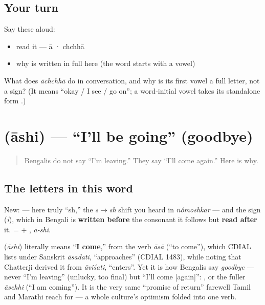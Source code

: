 \subsection*{Your turn}
Say these aloud:

\begin{itemize}
\raggedright
  \item read it — ā · chchhā
  \item why  is written in full here (the word starts with a vowel)
\end{itemize}

\begin{tcolorbox}[breakable,colback=teal!4,colframe=teal!35!black,title={Before you move on}]
What does \emph{āchchhā} do in conversation, and why is its first vowel a full letter, not a sign? (It means \textquotedblleft{}okay / I see / go on\textquotedblright{}; a word-initial vowel takes its standalone form \textbf{}.)
\end{tcolorbox}
\section[\texorpdfstring{\bn{আসি} (āshi)}{আসি (āshi)}]{ (āshi) — \textquotedblleft{}I'll be going\textquotedblright{} (goodbye)}

\label{lesson:BN-C01-ashi}



\begin{quote}
Bengalis do not say \textquotedblleft{}I'm leaving.\textquotedblright{} They say \textquotedblleft{}I'll come again.\textquotedblright{} Here is why.
\end{quote}

\subsection*{The letters in this word}
New: \textbf{} — here truly \textquotedblleft{}sh,\textquotedblright{} the \emph{s$\to$sh} shift you heard in \emph{nômoshkar} — and the \textbf{} sign (\emph{i}), which in Bengali is \textbf{written before} the consonant it follows but \textbf{read after} it. \textbf{} = \textbf{} + \textbf{}, \emph{ā-shi}.

\begin{cousinweb}
\textbf{} (\emph{āshi}) literally means \textquotedblleft{}\textbf{I come},\textquotedblright{} from the verb \emph{āsā} (\textquotedblleft{}to come\textquotedblright{}), which CDIAL lists under Sanskrit \emph{āsadati}, \textquotedblleft{}approaches\textquotedblright{} (CDIAL 1483), while noting that Chatterji derived it from \emph{āviśati}, \textquotedblleft{}enters\textquotedblright{}. Yet it is how Bengalis say \emph{goodbye} — never \textquotedblleft{}I'm leaving\textquotedblright{} (unlucky, too final) but \textquotedblleft{}I'll come {[}again{]}\textquotedblright{}: \textbf{}, or the fuller \emph{āschhi} (\textquotedblleft{}I am coming\textquotedblright{}). It is the very same \textquotedblleft{}promise of return\textquotedblright{} farewell Tamil and Marathi reach for — a whole culture's optimism folded into one verb.
\end{cousinweb}

